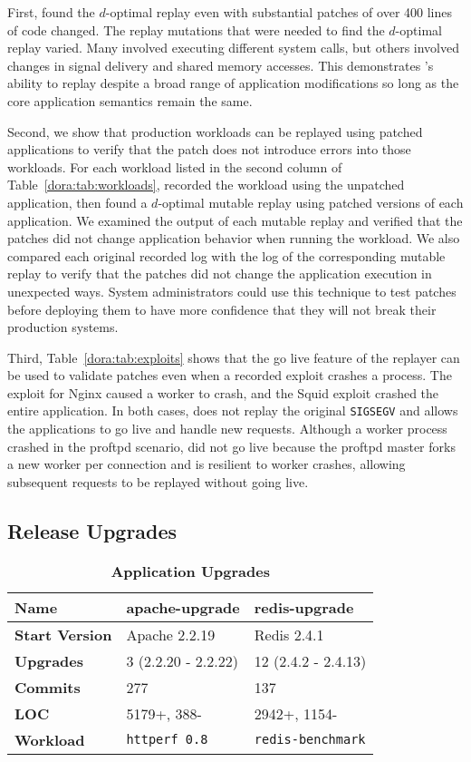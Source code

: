 First, {\dora} found the $d$-optimal replay
even with substantial patches of
over 400 lines of code changed. The replay mutations
that were needed to find the $d$-optimal replay varied. Many involved
executing different system calls, but others involved changes in
signal delivery and shared memory accesses. This demonstrates
{\dora}'s ability to replay despite a broad range of application
modifications so long as the core application semantics remain the
same.

Second, we show that production workloads can be replayed using patched
applications to verify that the patch does not introduce errors
into those workloads.
For each workload listed in the second column of Table~\ref{dora:tab:workloads},
{\dora} recorded the workload using the unpatched application, then found a
$d$-optimal mutable replay using patched versions of each application.  We
examined the output of each mutable replay and verified that the patches did not
change application behavior when running the workload.  We also compared each
original recorded log with the log of the corresponding mutable replay to verify
that the patches did not change the application execution in unexpected ways.
System administrators could use this technique to test patches before deploying
them to have more confidence that they will not break their production systems.

Third, Table~\ref{dora:tab:exploits} shows that the go live feature of the replayer
can be used to validate patches even when a recorded exploit crashes a process.
The exploit for Nginx caused a worker to crash, and the Squid exploit crashed the
entire application.
In both cases, {\dora} does not replay
the original {\tt SIGSEGV} and allows the applications to go live
and handle new requests. Although a worker process crashed in the proftpd
scenario, {\dora} did not go live because the
proftpd master forks a new worker per connection and is resilient to worker
crashes, allowing subsequent requests to be replayed without going live.

\subsection{Release Upgrades}
\label{dora:sec:upgrades}

\begin{table}[t]
\centering
\begin{tabular}{lll}   \toprule
 {\bf Name}         & apache-upgrade      & redis-upgrade         \\ \midrule
{\bf Start Version} & Apache 2.2.19       & Redis 2.4.1           \\
{\bf Upgrades}      & 3 (2.2.20 - 2.2.22) & 12 (2.4.2 - 2.4.13)   \\
{\bf Commits}       & 277                 & 137                   \\
{\bf LOC}           & 5179+, 388-         & 2942+, 1154-          \\
{\bf Workload}      & {\tt httperf 0.8}   & {\tt redis-benchmark} \\
    \bottomrule
\end{tabular}
\caption{{\bf Application Upgrades}}
\label{dora:tab:upgrades}
\end{table}

